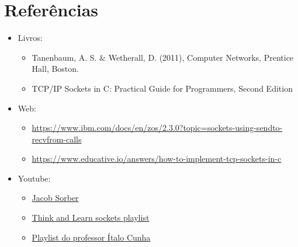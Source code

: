 \documentclass{article}
\begin{document}
\section{Referências}

\begin{itemize}
      \item Livros:
            \begin{itemize}
                  \item Tanenbaum, A. S. \& Wetherall, D. (2011), Computer
                        Networks, Prentice Hall, Boston.
                  \item TCP/IP Sockets in C\@: Practical Guide for Programmers,
                        Second Edition
            \end{itemize}

      \item Web:
            \begin{itemize}
                  \item

                        \url{https://www.ibm.com/docs/en/zos/2.3.0?topic=sockets-using-sendto-recvfrom-calls}
                  \item

                        \url{https://www.educative.io/answers/how-to-implement-tcp-sockets-in-c}

            \end{itemize}

      \item Youtube:
            \begin{itemize}
                  \item \href{https://www.youtube.com/@JacobSorber}{Jacob
                              Sorber}
                  \item

                        \href{https://www.youtube.com/watch?v=_lQ-3S4fJ0U&list=PLPyaR5G9aNDvs6TtdpLcVO43_jvxp4emI}{Think
                              and Learn sockets playlist}
                  \item

                        \href{https://www.youtube.com/watch?v=tJ3qNtv0HVs&t=2s}{Playlist do professor
                              Ítalo Cunha}
            \end{itemize}

\end{itemize}
\end{document}
